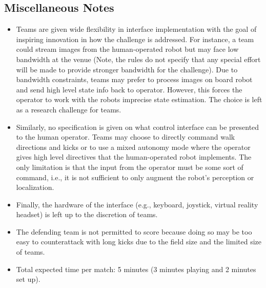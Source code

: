 \subsection{Miscellaneous Notes}

\begin{itemize}
\item Teams are given wide flexibility in interface implementation with the goal of inspiring innovation in how the challenge is addressed. For instance, a team could stream images from the human-operated robot but may face low bandwidth at the venue  (Note, the rules do not specify that any special effort will be made to provide stronger bandwidth for the challenge). Due to bandwidth constraints, teams may prefer to process images on board robot and send high level state info back to operator. However, this forces the operator to work with the robots imprecise state estimation. The choice is left as a research challenge for teams. 
\item Similarly, no specification is given on what control interface can be presented to the human operator. Teams may choose to directly command walk directions and kicks or to use a mixed autonomy mode where the operator gives high level directives that the human-operated robot implements. The only limitation is that the input from the operator must be some sort of command, i.e., it is not sufficient to only augment the robot's perception or localization.
\item Finally, the hardware of the interface (e.g., keyboard, joystick, virtual reality headset) is left up to the discretion of teams.
\item The defending team is not permitted to score because doing so may be too easy to counterattack with long kicks due to the field size and the limited size of teams.
\item Total expected time per match: 5 minutes (3 minutes playing and 2 minutes set up). 
\end{itemize}

